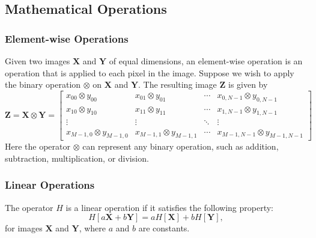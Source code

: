 \documentclass{article}
\begin{document}
\subsection{Mathematical Operations}
\subsubsection{Element-wise Operations}
Given two images \(\symbf{X}\) and \(\symbf{Y}\) of equal dimensions,
an element-wise operation is an operation that is applied to each pixel
in the image. Suppose we wish to apply the binary operation \(\otimes\)
on \(\symbf{X}\) and \(\symbf{Y}\). The resulting image \(\symbf{Z}\)
is given by
\begin{equation*}
    \symbf{Z} = \symbf{X} \otimes \symbf{Y} =
    \begin{bmatrix}
        x_{00} \otimes y_{00}       & x_{01} \otimes y_{01}       & \cdots & x_{0,N-1} \otimes y_{0,N-1}     \\
        x_{10} \otimes y_{10}       & x_{11} \otimes y_{11}       & \cdots & x_{1,N-1} \otimes y_{1,N-1}     \\
        \vdots                      & \vdots                      & \ddots & \vdots                          \\
        x_{M-1,0} \otimes y_{M-1,0} & x_{M-1,1} \otimes y_{M-1,1} & \cdots & x_{M-1,N-1} \otimes y_{M-1,N-1}
    \end{bmatrix}
\end{equation*}
Here the operator \(\otimes\) can represent any binary operation, such
as addition, subtraction, multiplication, or division.
\subsubsection{Linear Operations}
The operator \(H\) is a linear operation if it satisfies the following
property:
\begin{equation*}
    H\left[ a\symbf{X} + b\symbf{Y} \right] = aH\left[ \symbf{X} \right] + bH\left[ \symbf{Y} \right],
\end{equation*}
for images \(\symbf{X}\) and \(\symbf{Y}\), where \(a\) and \(b\) are constants.
\end{document}
